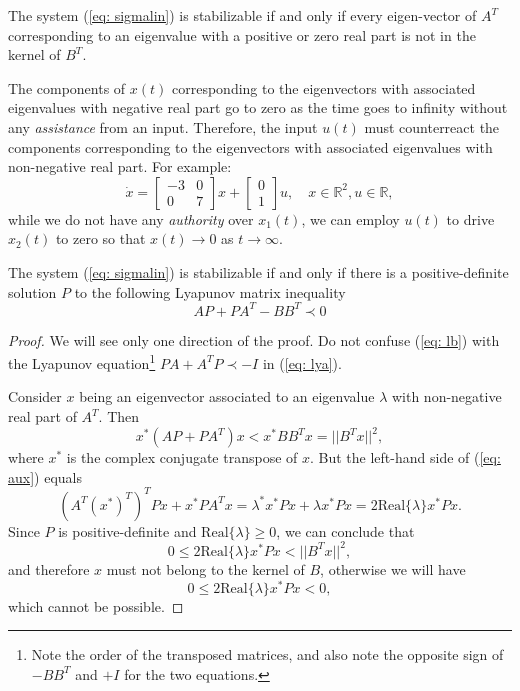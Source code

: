 \begin{theorem}
The system (\ref{eq: sigmalin}) is stabilizable if and only if every eigen-vector of $A^T$ corresponding to an eigenvalue with a positive or zero real part is not in the kernel of $B^T$.
\end{theorem}

The components of $x(t)$ corresponding to the eigenvectors with associated eigenvalues with negative real part go to zero as the time goes to infinity without any \emph{assistance} from an input. Therefore, the input $u(t)$ must counterreact the components corresponding to the eigenvectors with associated eigenvalues with non-negative real part. For example:
\begin{equation}
	\dot x = \begin{bmatrix}-3 & 0 \\ 0 & 7\end{bmatrix}x + \begin{bmatrix}0 \\ 1\end{bmatrix}u, \quad x\in\mathbb{R}^2, u\in\mathbb{R},
\end{equation}
while we do not have any \emph{authority} over $x_1(t)$, we can employ $u(t)$ to drive $x_2(t)$ to zero so that $x(t)\to 0$ as $t\to\infty$.
\begin{theorem}
	The system (\ref{eq: sigmalin}) is stabilizable if and only if there is a positive-definite solution $P$ to the following Lyapunov matrix inequality
	\begin{equation}
	AP + PA^T - BB^T \prec 0
		\label{eq: lb}
	\end{equation}
\end{theorem}
\begin{proof}
	We will see only one direction of the proof. Do not confuse (\ref{eq: lb}) with the Lyapunov equation\footnote{Note the order of the transposed matrices, and also note the opposite sign of $-BB^T$ and $+I$ for the two equations.} $PA+A^TP \prec -I$ in (\ref{eq: lya}).


Consider $x$ being an eigenvector associated to an eigenvalue $\lambda$ with non-negative real part of $A^T$. Then
	\begin{equation}
	x^*(AP+PA^T)x < x^*BB^Tx = ||B^Tx||^2,
		\label{eq: aux}
	\end{equation}
	where $x^*$ is the complex conjugate transpose of $x$. But the left-hand side of (\ref{eq: aux}) equals
	\begin{equation}
		(A^T(x^*)^T)^TPx + x^*PA^Tx = \lambda^*x^*Px + \lambda x^*Px = 2\text{Real}\{\lambda\}x^*Px.
	\end{equation}
	Since $P$ is positive-definite and $\text{Real}\{\lambda\} \geq 0$, we can conclude that
\begin{equation}
0 \leq 2\text{Real}\{\lambda\}x^*Px < ||B^Tx||^2,
\end{equation}
and therefore $x$ must not belong to the kernel of $B$, otherwise we will have
\begin{equation}
0 \leq 2\text{Real}\{\lambda\}x^*Px < 0,
\end{equation}
which cannot be possible.
\end{proof}

